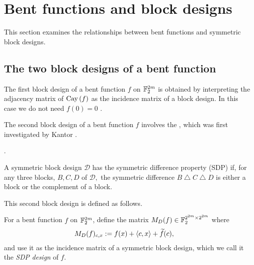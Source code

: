 \section{Bent functions and block designs}
\label{sec-Bent-designs}

This section examines the relationships between bent functions and symmetric block designs.



%
\subsection{The two block designs of a bent function}

The first block design of a bent function $f$ on $\mathbb{F}_2^{2m}$ is obtained by interpreting
the adjacency matrix of $\operatorname{Cay}\left(f\right)$ as the incidence matrix of a block design.
In this case we do not need $f(0)=0$ \cite[p. 160]{DilS87block}.

The second block design of a bent function $f$ involves the
, which was first investigated by Kantor
\cite[Section 5]{Kan75symplectic}.
\begin{Definition}
\label{def-Symmetric-difference-property}
\cite[p. 49]{Kan75symplectic}.

A symmetric block design $\mathcal{D}$ has the symmetric difference property (SDP)
if, for any three blocks, $B, C, D$ of $\mathcal{D},$ the symmetric difference
$B \bigtriangleup C \bigtriangleup D$ is either a block or the complement of a block.
\end{Definition}

This second block design is defined as follows.
\begin{Definition}
\label{def-SDP-design}
For a bent function  $f$ on $\mathbb{F}_2^{2m}$, define the matrix $M_D(f) \in \mathbb{F}_2^{2^{2m} \times 2^{2m}}$ where
\begin{align}
M_D(f)_{c,x} &:= f(x) + \langle c, x \rangle + \widetilde{f}(c),
\label{D-f-def}
\end{align}
and use it as the incidence matrix of a symmetric block design, which
we call it the \emph{SDP design} of $f$.
\end{Definition}

